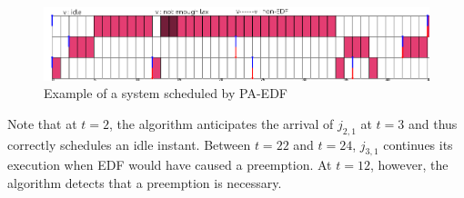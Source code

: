 \documentclass[a4paper,10pt]{article}
\begin{document}
        \begin{figure}[H]
        \begin{center}
            \centerline{\includegraphics[scale=0.6]{figs/PAEDF_example.png}}
            \caption{Example of a system scheduled by PA-EDF}
            \label{fig:paedf_example}
        \end{center}
        \end{figure}

        Note that at $t=2$, the algorithm anticipates the arrival of $j_{2,1}$ at $t=3$ and thus correctly schedules an idle instant. Between $t=22$ and $t=24$, $j_{3,1}$ continues its execution when EDF would have caused a preemption. At $t=12$, however, the algorithm detects that a preemption is necessary.

\nocite{*}


\end{document}
